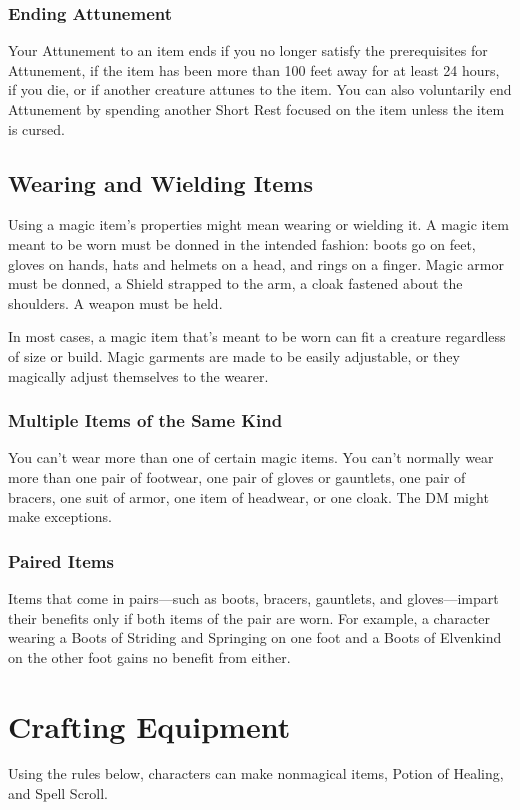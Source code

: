 \documentclass[10pt,a4paper,twoside,bg=print,twocolumn,openany,nodeprecatedcode]{dndbook}
\begin{document}
\subsubsection{Ending Attunement}
Your Attunement to an item ends if you no longer satisfy the prerequisites for Attunement, if the item has been more than 100 feet away for at least 24 hours, if you die, or if another creature attunes to the item. You can also voluntarily end Attunement by spending another Short Rest focused on the item unless the item is cursed.

\subsection{Wearing and Wielding Items}
Using a magic item's properties might mean wearing or wielding it. A magic item meant to be worn must be donned in the intended fashion: boots go on feet, gloves on hands, hats and helmets on a head, and rings on a finger. Magic armor must be donned, a Shield strapped to the arm, a cloak fastened about the shoulders. A weapon must be held.

In most cases, a magic item that's meant to be worn can fit a creature regardless of size or build. Magic garments are made to be easily adjustable, or they magically adjust themselves to the wearer.

\subsubsection{Multiple Items of the Same Kind}
You can't wear more than one of certain magic items. You can't normally wear more than one pair of footwear, one pair of gloves or gauntlets, one pair of bracers, one suit of armor, one item of headwear, or one cloak. The DM might make exceptions.

\subsubsection{Paired Items}
Items that come in pairs—such as boots, bracers, gauntlets, and gloves—impart their benefits only if both items of the pair are worn. For example, a character wearing a Boots of Striding and Springing on one foot and a Boots of Elvenkind on the other foot gains no benefit from either.

\section{Crafting Equipment}
Using the rules below, characters can make nonmagical items, Potion of Healing, and Spell Scroll.
\end{document}

